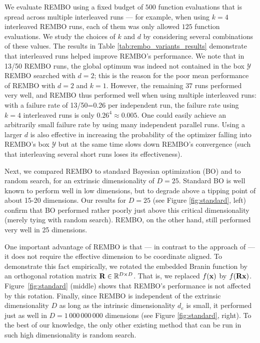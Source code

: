 \documentclass{article}
\begin{document}
We evaluate REMBO using a fixed budget of $500$ function
evaluations that is spread across multiple interleaved runs ---
for example, when using $k = 4$ interleaved REMBO runs,
each of them was only allowed $125$ function evaluations. 
We study the choices of $k$ and $d$ by considering several combinations of these values.
The results in Table \ref{tab:rembo_variants_results} demonstrate that interleaved runs helped improve REMBO's performance.
We note that in 13/50 REMBO runs, the global optimum was indeed not contained in the box $\mathcal{Y}$ REMBO searched with $d=2$; this is the reason for the poor mean performance of REMBO with $d=2$ and $k=1$.
However, the remaining $37$ runs performed very well, and REMBO thus performed well when using multiple interleaved runs: with a failure rate of 13/50=0.26 per independent run, the failure rate using $k=4$ interleaved runs is only $0.26^4\approx 0.005$. One could easily achieve an arbitrarily small failure rate by using many independent parallel runs. 
Using a larger $d$ is also effective in increasing the probability of the optimizer falling into REMBO's box $\mathcal{Y}$ but at the same time slows down REMBO's convergence (such that interleaving several short runs loses its effectiveness). 
 
Next, we compared REMBO to standard Bayesian optimization (BO) and to random search, for an extrinsic dimensionality of $D=25$. 
Standard BO is well known to perform well in low dimensions, but to degrade above a tipping point of about 15-20 dimensions. Our results for $D=25$ (see Figure \ref{fig:standard}, left) confirm that BO performed rather poorly just above this critical dimensionality (merely tying with random search). 
REMBO, on the other hand, still performed very well in 25 dimensions.

One important advantage of REMBO is that --- in contrast to the approach of \cite{Chen:2012} --- it does not require the effective dimension to be coordinate aligned. To demonstrate this fact empirically, we rotated the embedded Branin function by an orthogonal rotation matrix $\mathbf{R} \in \mathbb{R}^{D\times D}$. That is, we replaced $f(\mathbf{x})$ by $f(\mathbf{R} \mathbf{x})$.
Figure~\ref{fig:standard} (middle) shows that REMBO's performance is not affected by this rotation. 
%
Finally, since REMBO is independent of the extrinsic dimensionality $D$ as long as the intrinsic dimensionality $d_e$ is small, it performed just as well in $D=1\,000\,000\,000$ dimensions (see Figure \ref{fig:standard}, right). 
To the best of our knowledge, the only other existing method that can be run in such high dimensionality is random search.
\end{document}
